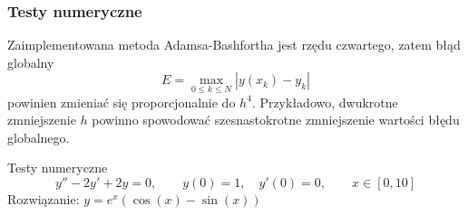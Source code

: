 \documentclass[9pt]{beamer}
\begin{document}
\begin{frame}
	\frametitle{Testy numeryczne}
	\begin{spacing}{1.25}
        Zaimplementowana metoda Adamsa-Bashfortha jest rzędu czwartego, zatem błąd globalny 
        $$ E = \max \limits_{0\leq k \leq N} |y(x_k) - y_k| $$
        powinien zmieniać się proporcjonalnie do $h^4$. Przykładowo, dwukrotne zmniejszenie $h$ powinno spowodować szesnastokrotne zmniejszenie wartości błędu globalnego.
	\end{spacing}
\end{frame}

\begin{frame}{Testy numeryczne}
\vspace{-11pt}
    $$y'' - 2y' + 2y = 0, \qquad y(0) = 1, \quad y'(0) = 0, \qquad x\in[0,10]$$
    \centering
    Rozwiązanie: $y = e^x(\cos(x) - \sin(x))$
    \begin{table}[]
\end{table}
\end{frame}
\end{document}
